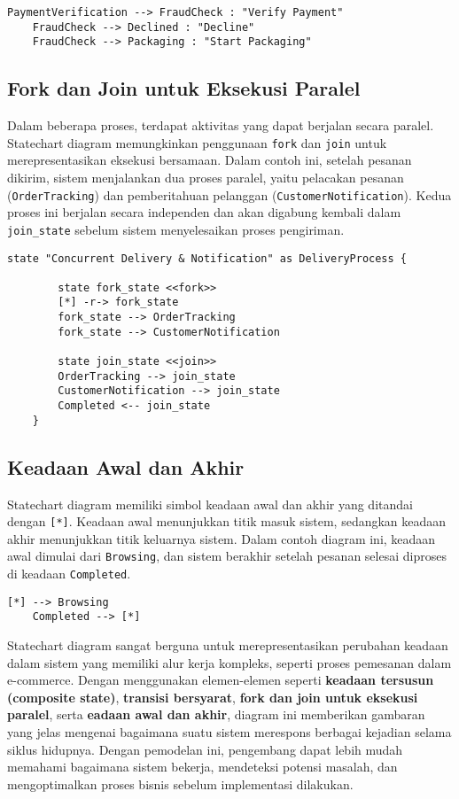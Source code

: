 \begin{lstlisting}[language=puml]
	PaymentVerification --> FraudCheck : "Verify Payment"
	FraudCheck --> Declined : "Decline"
	FraudCheck --> Packaging : "Start Packaging"
\end{lstlisting}

\subsection{Fork dan Join untuk Eksekusi Paralel}
Dalam beberapa proses, terdapat aktivitas yang dapat berjalan secara paralel. Statechart diagram memungkinkan penggunaan \texttt{fork} dan \texttt{join} untuk merepresentasikan eksekusi bersamaan. Dalam contoh ini, setelah pesanan dikirim, sistem menjalankan dua proses paralel, yaitu pelacakan pesanan (\texttt{OrderTracking}) dan pemberitahuan pelanggan (\texttt{CustomerNotification}). Kedua proses ini berjalan secara independen dan akan digabung kembali dalam \texttt{join\_state} sebelum sistem menyelesaikan proses pengiriman.

\begin{lstlisting}[language=puml]
	state "Concurrent Delivery & Notification" as DeliveryProcess {
		
		state fork_state <<fork>>
		[*] -r-> fork_state 
		fork_state --> OrderTracking
		fork_state --> CustomerNotification
		
		state join_state <<join>>
		OrderTracking --> join_state
		CustomerNotification --> join_state
		Completed <-- join_state
	}
\end{lstlisting}

\subsection{Keadaan Awal dan Akhir}
Statechart diagram memiliki simbol keadaan awal dan akhir yang ditandai dengan \texttt{[*]}. Keadaan awal menunjukkan titik masuk sistem, sedangkan keadaan akhir menunjukkan titik keluarnya sistem. Dalam contoh diagram ini, keadaan awal dimulai dari \texttt{Browsing}, dan sistem berakhir setelah pesanan selesai diproses di keadaan \texttt{Completed}.

\begin{lstlisting}[language=puml]
	[*] --> Browsing
	Completed --> [*]
\end{lstlisting}

Statechart diagram sangat berguna untuk merepresentasikan perubahan keadaan dalam sistem yang memiliki alur kerja kompleks, seperti proses pemesanan dalam e-commerce. Dengan menggunakan elemen-elemen seperti \textbf{keadaan tersusun (composite state)}, \textbf{transisi bersyarat}, \textbf{fork dan join untuk eksekusi paralel}, serta \textbf{eadaan awal dan akhir}, diagram ini memberikan gambaran yang jelas mengenai bagaimana suatu sistem merespons berbagai kejadian selama siklus hidupnya. Dengan pemodelan ini, pengembang dapat lebih mudah memahami bagaimana sistem bekerja, mendeteksi potensi masalah, dan mengoptimalkan proses bisnis sebelum implementasi dilakukan.


